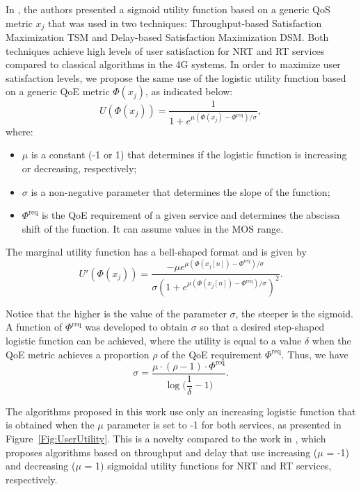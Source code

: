 \documentclass[12pt]{article}
\newcommand{\FigRef}[1]{Figure~\ref{#1}}
\begin{document}
In \cite{Rodrigues2014_Wiley}, the authors presented a sigmoid utility function based on a generic \ac{QoS} metric $x_j$ that was used in two techniques: Throughput-based Satisfaction Maximization \ac{TSM} and Delay-based Satisfaction Maximization \ac{DSM}. Both techniques achieve high levels of user satisfaction for \ac{NRT} and \ac{RT} services compared to classical algorithms in the \ac{4G} systems. In order to maximize user satisfaction levels, we propose the same use of the logistic utility function based on a generic \ac{QoE} metric $\Phi(x_j)$, as indicated below:
%	
\begin{equation}
U\left(\Phi(x_j)\right) = \dfrac{1}{1 + e^{\mu (\Phi(x_j) - \Phi^{\mathrm{req}}) / \sigma}},
\label{Eq:TSMQoESigmoid}
\end{equation}
%
where:
\begin{itemize} 
	\item $\mu$ is a constant (-1 or 1) that determines if the logistic function is increasing or decreasing, respectively;
	\item $\sigma$ is a non-negative parameter that determines the slope of the function; 
	\item $\Phi^{\text{req}}$ is the \ac{QoE} requirement of a given service and determines the abscissa shift of the function. It can assume values in the \ac{MOS} range.
\end{itemize}

The marginal utility function has a bell-shaped format and is given by
%
\begin{equation}
\label{Eq:wQoE}
U'\left(\Phi\left(x_j\right)\right)=\dfrac{- \mu  e^{\mu (\Phi(x_{j}[n]) - \Phi^{\text{req}}) / \sigma}}{\sigma (1 + e^{\mu (\Phi(x_{j}[n]) - \Phi^{\text{req}}) / \sigma})^{2}}.
\end{equation}

Notice that the higher is the value of the parameter $\sigma$, the steeper is the sigmoid. A function of $ \Phi^{\mathrm{req}}$ was developed to obtain $\sigma$ so that a desired step-shaped logistic function can be achieved, where the utility is equal to a value $\delta$ when the QoE metric achieves a proportion $\rho$ of the QoE requirement $\Phi^{\text{req}}$. Thus, we have
%
\begin{equation}
\label{Eq:Sigma}
\sigma = \dfrac{\mu \cdot (\rho - 1) \cdot \Phi^{\text{req}}}{\log \Big( \dfrac{1}{\delta} - 1\Big)}.
\end{equation}

The algorithms proposed in this work use only an increasing logistic function that is obtained when the $\mu$ parameter is set to -1 for both services, as presented in \FigRef{Fig:UserUtility}. This is a novelty compared to the work in \cite{Rodrigues2014_Wiley}, which proposes algorithms based on throughput and delay that use increasing ($\mu$ = -1) and decreasing ($\mu$ = 1) sigmoidal utility functions for \ac{NRT} and \ac{RT} services, respectively.
\end{document}

